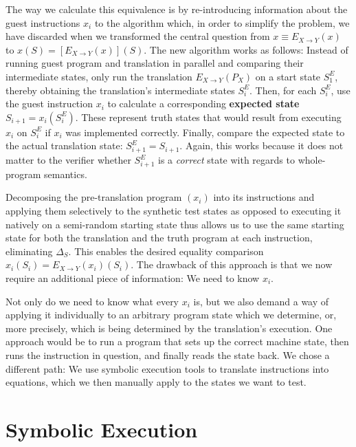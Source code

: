 The way we calculate this equivalence is by re-introducing information about the guest instructions $x_i$ to the
algorithm which, in order to simplify the problem, we have discarded when we transformed the central question from $x
\equiv E_{X \rightarrow Y}(x)$ to $x(S) = [E_{X \rightarrow Y}(x)](S)$. The new algorithm works as follows: Instead of
running guest program and translation in parallel and comparing their intermediate states, only run the translation
$E_{X \rightarrow Y}(P_X)$ on a start state $S^E_1$, thereby obtaining the translation's intermediate states $S^E_i$.
Then, for each $S^E_i$, use the guest instruction $x_i$ to calculate a corresponding \textbf{expected state} $S_{i+1} =
x_i(S^E_i)$. These represent truth states that would result from executing $x_i$ on $S^E_i$ if $x_i$ was implemented
correctly. Finally, compare the expected state to the actual translation state: $S^E_{i+1} = S_{i+1}$. Again, this works
because it does not matter to the verifier whether $S^E_{i+1}$ is a \textit{correct} state with regards to whole-program
semantics.

Decomposing the pre-translation program $(x_i)$ into its instructions and applying them selectively to the synthetic
test states as opposed to executing it natively on a semi-random starting state thus allows us to use the same starting
state for both the translation and the truth program at each instruction, eliminating $\Delta_S$. This enables the
desired equality comparison $x_i(S_i) = E_{X \rightarrow Y}(x_i)(S_i)$. The drawback of this approach is that we now
require an additional piece of information: We need to know $x_i$.

Not only do we need to know what every $x_i$ is, but we also demand a way of applying it individually to an arbitrary
program state which we determine, or, more precisely, which is being determined by the translation's execution. One
approach would be to run a program that sets up the correct machine state, then runs the instruction in question, and
finally reads the state back. We chose a different path: We use symbolic execution tools to translate instructions into
equations, which we then manually apply to the states we want to test.

\section{Symbolic Execution}\label{sec:symb_exec}

